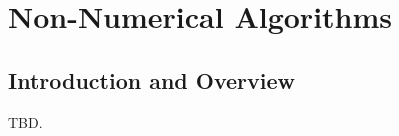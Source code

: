 \chapter{Non-Numerical Algorithms}
\label{cnna0}

\section{Introduction and Overview}
\label{cnna0:siov0}

TBD.

